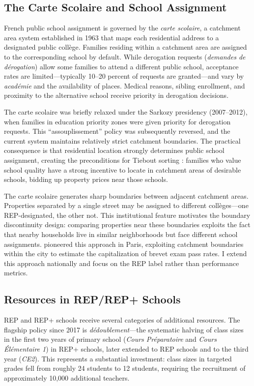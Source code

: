 \documentclass[12pt]{article}
\begin{document}
\subsection{The Carte Scolaire and School Assignment}

French public school assignment is governed by the \textit{carte scolaire}, a catchment area system established in 1963 that maps each residential address to a designated public coll\`{e}ge. Families residing within a catchment area are assigned to the corresponding school by default. While derogation requests (\textit{demandes de d\'{e}rogation}) allow some families to attend a different public school, acceptance rates are limited---typically 10--20 percent of requests are granted---and vary by \textit{acad\'{e}mie} and the availability of places. Medical reasons, sibling enrollment, and proximity to the alternative school receive priority in derogation decisions.

The carte scolaire was briefly relaxed under the Sarkozy presidency (2007--2012), when families in education priority zones were given priority for derogation requests. This ``assouplissement'' policy was subsequently reversed, and the current system maintains relatively strict catchment boundaries. The practical consequence is that residential location strongly determines public school assignment, creating the preconditions for Tiebout sorting \citep{tiebout1956}: families who value school quality have a strong incentive to locate in catchment areas of desirable schools, bidding up property prices near those schools.

The carte scolaire generates sharp boundaries between adjacent catchment areas. Properties separated by a single street may be assigned to different coll\`{e}ges---one REP-designated, the other not. This institutional feature motivates the boundary discontinuity design: comparing properties near these boundaries exploits the fact that nearby households live in similar neighborhoods but face different school assignments. \citet{fack2010} pioneered this approach in Paris, exploiting catchment boundaries within the city to estimate the capitalization of brevet exam pass rates. I extend this approach nationally and focus on the REP label rather than performance metrics.

\subsection{Resources in REP/REP+ Schools}

REP and REP+ schools receive several categories of additional resources. The flagship policy since 2017 is \textit{d\'{e}doublement}---the systematic halving of class sizes in the first two years of primary school (\textit{Cours Pr\'{e}paratoire} and \textit{Cours \'{E}l\'{e}mentaire 1}) in REP+ schools, later extended to REP schools and to the third year (\textit{CE2}). This represents a substantial investment: class sizes in targeted grades fell from roughly 24 students to 12 students, requiring the recruitment of approximately 10,000 additional teachers.
\end{document}
